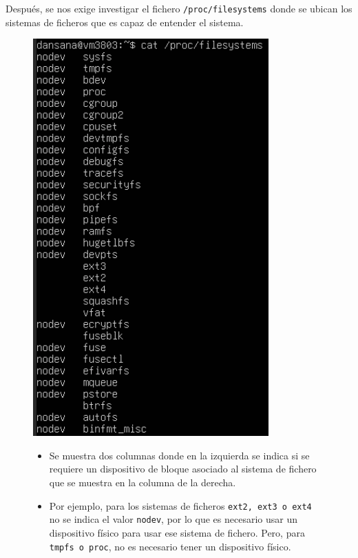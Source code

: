 \documentclass[10pt]{article}
\begin{document}
	Después, se nos exige investigar el fichero \verb|/proc/filesystems| donde se ubican los sistemas de ficheros que es capaz de entender el sistema.
	\begin{figure}[H]
		\centering
		\begin{minipage}{0.28\textwidth}
			\centering
			\includegraphics[width=\linewidth]{Recursos/filesystems.png}
		\end{minipage}\hfill
		\begin{minipage}{0.7\textwidth}
			\begin{itemize}
				\item Se muestra dos columnas donde en la izquierda se indica si se requiere un dispositivo de bloque asociado al sistema de fichero que se muestra en la columna de la derecha.
				\item Por ejemplo, para los sistemas de ficheros \verb|ext2, ext3 o ext4| no se indica el valor \verb|nodev|, por lo que es necesario usar un dispositivo físico para usar ese sistema de fichero. Pero, para \verb|tmpfs o proc|, no es necesario tener un dispositivo físico.
			\end{itemize}
		\end{minipage}
	\end{figure}
	
\end{document}
